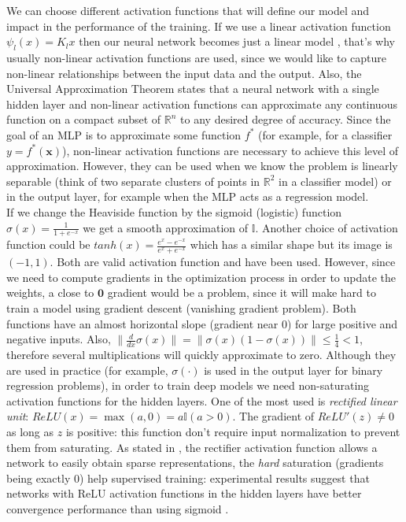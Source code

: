 We can choose different activation functions that will define our model and impact in the performance of the training. If we use a linear activation function $\psi_l (x) = K_l x$ then our neural network becomes just a linear model \cite{murphy2022}, that's why usually non-linear activation functions are used, since we would like to capture non-linear relationships between the input data and the output. Also, the Universal Approximation Theorem states that a neural network with a single hidden layer and non-linear activation functions can approximate any continuous function on a compact subset of $\mathbb{R}^n$ to any desired degree of accuracy.
Since the goal of an MLP is to approximate some function $f^*$ (for example, for a classifier $y = f^*(\mathbf{x})$), non-linear activation functions are necessary to achieve this level of approximation.
However, they can be used when we know the problem is linearly separable (think of two separate clusters of points in $\mathbb{R}^2$ in a classifier model) or in the output layer, for example when the MLP acts as a regression model.\\
If we change the Heaviside function by the sigmoid (logistic) function $\sigma(x) = \frac{1}{1+e^{-x}}$ we get a smooth approximation of $\mathbb{I}$. Another choice of activation function could be $tanh(x) = \frac{e^x - e^{-x}}{e^x + e^{-x}}$ which has a similar shape but its image is $(-1,1)$. Both are valid activation function and have been used. However, since we need to compute gradients in the optimization process in order to update the weights, a close to $\mathbf{0}$ gradient would be a problem, since it will make hard to train a model using gradient descent (vanishing gradient problem).
Both functions have an almost horizontal slope (gradient near 0) for large positive and negative inputs. Also, $\lVert \frac{d}{dx} \sigma(x) \rVert = \lVert \sigma(x)(1-\sigma(x)) \rVert \leq \frac{1}{4} < 1$, therefore several multiplications will quickly approximate to zero. Although they are used in practice (for example, $\sigma(\cdot)$ is used in the output layer for binary regression problems), in order to train deep models we need non-saturating activation functions for the hidden layers.
One of the most used is \textit{rectified linear unit}: $ReLU(x) = \max (a,0) = a \mathbb{I}(a>0)$. The gradient of $ReLU'(z) \neq 0$ as long as $z$ is positive: this function don't require input normalization to prevent them from saturating.
As stated in \cite*{glorot2011}, the rectifier activation function allows a network to easily obtain sparse representations, the \textit{hard} saturation (gradients being exactly 0) help supervised training: experimental results suggest that networks with ReLU activation functions in the hidden layers have better convergence performance than using sigmoid \cite{krizhevsky2017}.\\

